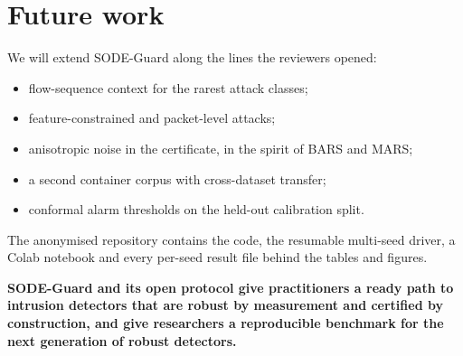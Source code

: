 \documentclass[11pt]{article}
\begin{document}
\section*{Future work}
We will extend SODE-Guard along the lines the reviewers opened:
\begin{itemize}
\item flow-sequence context for the rarest attack classes;
\item feature-constrained and packet-level attacks;
\item anisotropic noise in the certificate, in the spirit of BARS and MARS;
\item a second container corpus with cross-dataset transfer;
\item conformal alarm thresholds on the held-out calibration split.
\end{itemize}

The anonymised repository contains the code, the resumable multi-seed driver, a
Colab notebook and every per-seed result file behind the tables and figures.

\medskip
\textbf{SODE-Guard and its open protocol give practitioners a ready path to
intrusion detectors that are robust by measurement and certified by
construction, and give researchers a reproducible benchmark for the next
generation of robust detectors.}
\end{document}
